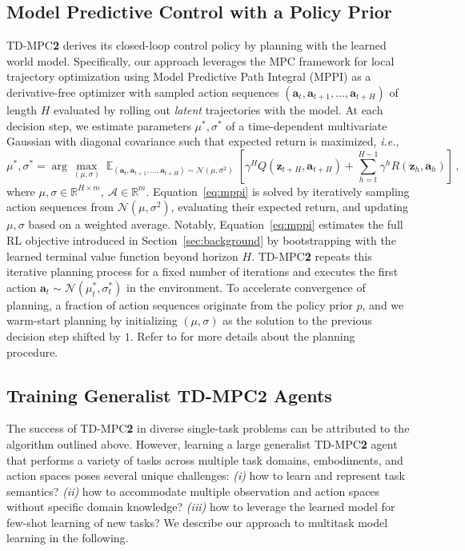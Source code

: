 \documentclass{article}
\begin{document}
\subsection{Model Predictive Control with a Policy Prior}
\label{sec:tdmpc2-planning}
TD-MPC\textbf{2} derives its closed-loop control policy by planning with the learned world model. Specifically, our approach leverages the MPC framework for local trajectory optimization using Model Predictive Path Integral (MPPI) \citep{Williams2015ModelPP} as a derivative-free optimizer with sampled action sequences $(\mathbf{a}_{t}, \mathbf{a}_{t+1}, \dots, \mathbf{a}_{t+H})$ of length $H$ evaluated by rolling out \emph{latent} trajectories with the model. At each decision step, we estimate parameters $\mu^*,\sigma^*$ of a time-dependent multivariate Gaussian with diagonal covariance such that expected return is maximized, \emph{i.e.},
\begin{equation}
    \label{eq:mppi}
    \mu^*,\sigma^* = \arg\max_{(\mu,\sigma)} \mathop{\mathbb{E}}_{(\mathbf{a}_{t}, \mathbf{a}_{t+1}, \dots, \mathbf{a}_{t+H})\sim \mathcal{N}(\mu,\sigma^{2})}\left[ \gamma^{H} Q(\mathbf{z}_{t+H}, \mathbf{a}_{t+H}) + \sum_{h=t}^{H-1} \gamma^{h} R(\mathbf{z}_{h}, \mathbf{a}_{h}) \right]\,,
\end{equation}
where $\mu,\sigma \in \mathbb{R}^{H\times m},~\mathcal{A} \in \mathbb{R}^{m}$. Equation~\ref{eq:mppi} is solved by iteratively sampling action sequences from $\mathcal{N}(\mu,\sigma^{2})$, evaluating their expected return, and updating $\mu,\sigma$ based on a weighted average. Notably, Equation~\ref{eq:mppi} estimates the full RL objective introduced in Section~\ref{sec:background} by bootstrapping with the learned terminal value function beyond horizon $H$. TD-MPC\textbf{2} repeats this iterative planning process for a fixed number of iterations and executes the first action $\mathbf{a}_{t} \sim \mathcal{N}(\mu^{*}_{t}, \sigma^{*}_{t})$ in the environment. To accelerate convergence of planning, a fraction of action sequences originate from the policy prior $p$, and we warm-start planning by initializing $(\mu,\sigma)$ as the solution to the previous decision step shifted by $1$. Refer to \citet{Hansen2022tdmpc} for more details about the planning procedure.

\subsection{Training Generalist TD-MPC\textcolor{nhred}{\textbf{2}} Agents}
\label{sec:generalist-agents}
\vspace{-0.025in}
The success of TD-MPC\textbf{2} in diverse single-task problems can be attributed to the algorithm outlined above. However, learning a large generalist TD-MPC\textbf{2} agent that performs a variety of tasks across multiple task domains, embodiments, and action spaces poses several unique challenges: \emph{(i)} how to learn and represent task semantics? \emph{(ii)} how to accommodate multiple observation and action spaces without specific domain knowledge? \emph{(iii)} how to leverage the learned model for few-shot learning of new tasks? We describe our approach to multitask model learning in the following.
\end{document}
